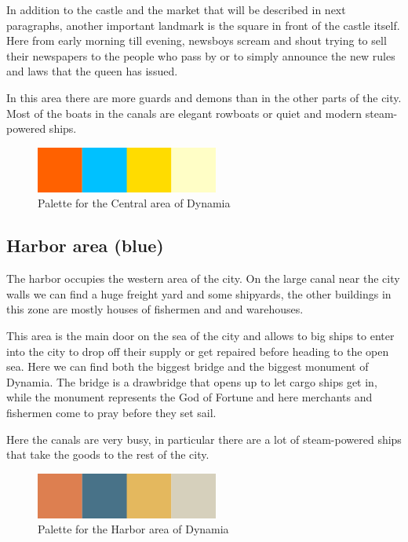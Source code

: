 In addition to the castle and the market that will be described in next paragraphs, another important landmark is the square in front of the castle itself. Here from early morning till evening, newsboys scream and shout trying to sell their newspapers to the people who pass by or to simply announce the new rules and laws that the queen has issued.

In this area there are more guards and demons than in the other parts of the city. Most of the boats in the canals are elegant rowboats or quiet and modern steam-powered ships.

\begin{figure}[H]
  \centering
  \includegraphics[width=6cm]{Images/Palettes/dynamiaCentralArea}
  \caption{Palette for the Central area of Dynamia}
\end{figure}

\subsection{Harbor area (blue)}
The harbor occupies the western area of the city. On the large canal near the city walls we can find a huge freight yard and some shipyards, the  other buildings in this zone are mostly houses of fishermen and and warehouses.

This area is the main door on the sea of the city and allows to big ships to enter into the city to drop off their supply or get repaired before heading to the open sea. Here we can find both the biggest bridge and the biggest monument of Dynamia. The bridge is a drawbridge that opens up to let cargo ships get in, while the monument represents the God of Fortune and here merchants and fishermen come to pray before they set sail.

Here the canals are very busy, in particular there are a lot of steam-powered ships that take the goods to the rest of the city.

\begin{figure}[H]
  \centering
  \includegraphics[width=6cm]{Images/Palettes/dynamiaHarborArea}
  \caption{Palette for the Harbor area of Dynamia}
\end{figure}

